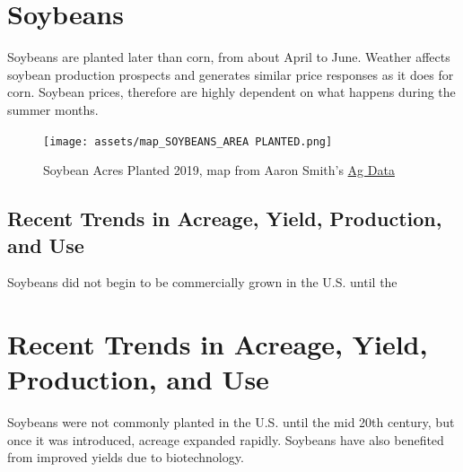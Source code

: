 \documentclass[
  letterpaper,
  DIV=11,
  numbers=noendperiod]{scrreprt}
\begin{document}
\section{Soybeans}\label{soybeans}

Soybeans are planted later than corn, from about April to June. Weather
affects soybean production prospects and generates similar price
responses as it does for corn. Soybean prices, therefore are highly
dependent on what happens during the summer months.

\begin{figure}[H]

{\centering \texttt{[image: assets/map\_SOYBEANS\_AREA PLANTED.png]}

}

\caption{Soybean Acres Planted 2019, map from Aaron Smith's
\href{https://asmith.ucdavis.edu/data/us-crops}{Ag Data}}

\end{figure}%

\subsection{Recent Trends in Acreage, Yield, Production, and
Use}\label{recent-trends-in-acreage-yield-production-and-use}

Soybeans did not begin to be commercially grown in the U.S. until the

\section{Recent Trends in Acreage, Yield, Production, and
Use}\label{recent-trends-in-acreage-yield-production-and-use-1}

Soybeans were not commonly planted in the U.S. until the mid 20th
century, but once it was introduced, acreage expanded rapidly. Soybeans
have also benefited from improved yields due to biotechnology.
\end{document}
